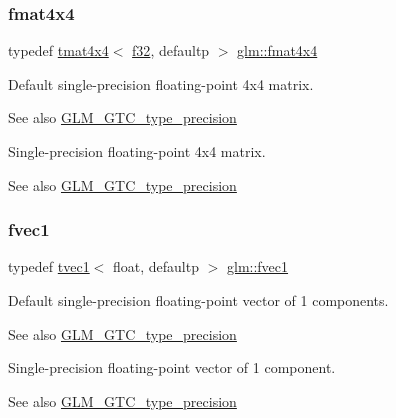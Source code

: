 \subsubsection{\texorpdfstring{fmat4x4}{fmat4x4}}
{\footnotesize\ttfamily typedef \hyperlink{structglm_1_1tmat4x4}{tmat4x4}$<$ \hyperlink{group__gtc__type__precision_ga0ec999b57f5330d9021256e96038df04}{f32}, defaultp $>$ \hyperlink{group__gtc__type__precision_ga16b508b75c7213ba6b24055ff3b7503d}{glm\+::fmat4x4}}

Default single-\/precision floating-\/point 4x4 matrix. \begin{DoxySeeAlso}{See also}
\hyperlink{group__gtc__type__precision}{G\+L\+M\+\_\+\+G\+T\+C\+\_\+type\+\_\+precision}
\end{DoxySeeAlso}
Single-\/precision floating-\/point 4x4 matrix. \begin{DoxySeeAlso}{See also}
\hyperlink{group__gtc__type__precision}{G\+L\+M\+\_\+\+G\+T\+C\+\_\+type\+\_\+precision} 
\end{DoxySeeAlso}
\mbox{\label{group__gtc__type__precision_gaa732e5d06540922c44d3e35f32d6e948}} 
\subsubsection{\texorpdfstring{fvec1}{fvec1}}
{\footnotesize\ttfamily typedef \hyperlink{structglm_1_1tvec1}{tvec1}$<$ float, defaultp $>$ \hyperlink{group__gtc__type__precision_gaa732e5d06540922c44d3e35f32d6e948}{glm\+::fvec1}}

Default single-\/precision floating-\/point vector of 1 components. \begin{DoxySeeAlso}{See also}
\hyperlink{group__gtc__type__precision}{G\+L\+M\+\_\+\+G\+T\+C\+\_\+type\+\_\+precision}
\end{DoxySeeAlso}
Single-\/precision floating-\/point vector of 1 component. \begin{DoxySeeAlso}{See also}
\hyperlink{group__gtc__type__precision}{G\+L\+M\+\_\+\+G\+T\+C\+\_\+type\+\_\+precision} 
\end{DoxySeeAlso}
\mbox{\label{group__gtc__type__precision_ga83fb34639f810d0c9240cf7ff0180e20}} 
